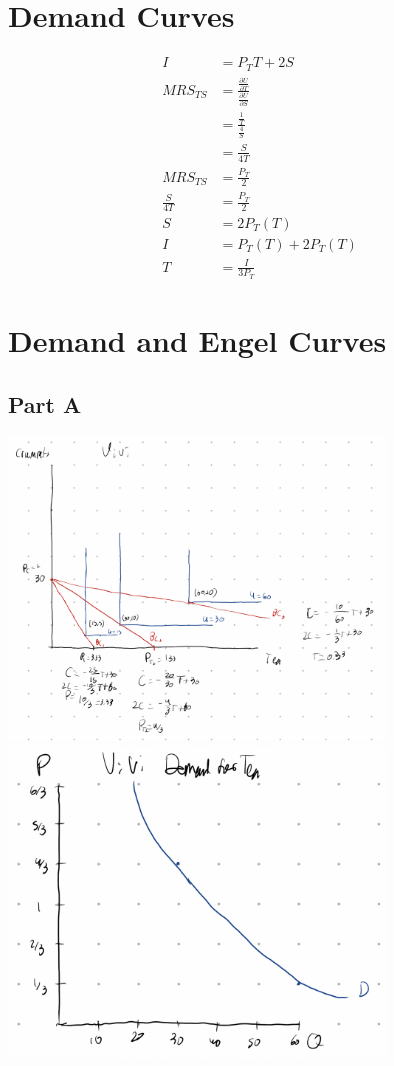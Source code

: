 \documentclass[8pt]{extarticle}
\begin{document}
{\section*{Demand Curves}
\begin{align*}
	I &= P_T T + 2S \\
	MRS_{TS} &= \frac{\frac{\partial U}{\partial T}}{\frac{\partial U}{\partial S}} \\
	&= \frac{\frac{1}{T}}{\frac{4}{S}} \\
	&= \frac{S}{4T} \\
	MRS_{TS} &= \frac{P_T}{2} \\
	\frac{S}{4T} &= \frac{P_T}{2} \\
	S &= 2P_T (T) \\
	I &= P_T(T) + 2P_T(T) \\
	T &= \boxed{\frac{I}{3P_T}}
\end{align*}
\section*{Demand and Engel Curves}
\subsection*{Part A}
\begin{center}
	\includegraphics[width=10cm]{HW4Q5AI}
	\includegraphics[width=10cm]{HW4Q5AII}
\end{center}
}
\end{document}
